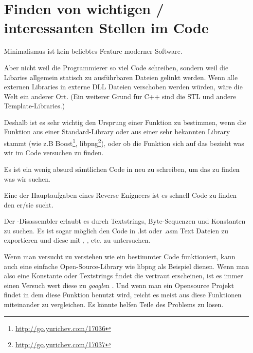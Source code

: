 \chapter{Finden von wichtigen / interessanten Stellen im Code}

Minimalismus ist kein beliebtes Feature moderner Software.


Aber nicht weil die Programmierer so viel Code schreiben, sondern weil die Libaries
allgemein statisch zu ausf\"uhrbaren Dateien gelinkt werden. Wenn alle externen
Libraries in externe DLL Dateien verschoben werden w\"urden, w\"are die Welt ein
anderer Ort. (Ein weiterer Grund f\"ur C++ sind die \ac{STL} und andere Template-Libraries.)

\newcommand{\FOOTNOTEBOOST}{\footnote{\url{http://go.yurichev.com/17036}}}
\newcommand{\FOOTNOTELIBPNG}{\footnote{\url{http://go.yurichev.com/17037}}}

Deshalb ist es sehr wichtig den Ursprung einer Funktion zu bestimmen, wenn die
Funktion aus einer Standard-Library oder aus einer sehr bekannten Library stammt
(wie z.B Boost\FOOTNOTEBOOST, libpng\FOOTNOTELIBPNG), oder ob die Funktion sich
auf das bezieht was wir im Code versuchen zu finden.

Es ist ein wenig absurd s\"amtlichen Code in \CCpp neu zu schreiben, um das zu
finden was wir suchen.

Eine der Hauptaufgaben eines Reverse Enigneers ist es schnell Code zu finden den
er/sie sucht.

\myindex{\GrepUsage}

Der \IDA-Disassembler erlaubt es durch Textstrings, Byte-Sequenzen und Konstanten
zu suchen.  Es ist sogar m\"oglich den Code in .lst oder .asm Text Dateien zu
exportieren und diese mit , , etc. zu untersuchen.

Wenn man versucht zu verstehen wie ein bestimmter Code funktioniert, kann auch
eine einfache Open-Source-Library wie libpng als Beispiel dienen.
Wenn man also eine Konstante oder Textstrings findet die vertraut erscheinen, ist
es immer einen Versuch wert diese zu \emph{google}n .
Und wenn man ein Opensource Projekt findet in dem diese Funktion benutzt wird, 
reicht es meist aus diese Funktionen miteinander zu vergleichen.
Es k\"onnte helfen Teile des Problems zu l\"osen.


